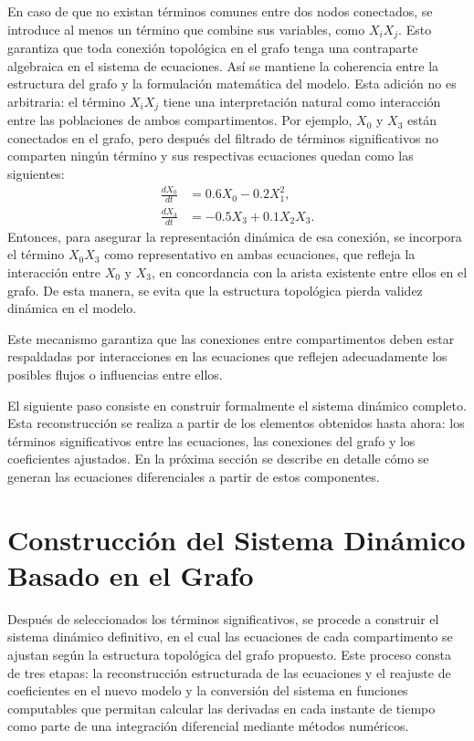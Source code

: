 En caso de que no existan términos comunes entre dos nodos conectados, se introduce al menos un término que combine sus variables, como \(X_i X_j\). Esto garantiza 
que toda conexión topológica en el grafo tenga una contraparte algebraica en el sistema de ecuaciones. Así se mantiene la coherencia entre la estructura del grafo y la 
formulación matemática del modelo. Esta adición no es arbitraria: el término \(X_i X_j\) tiene una interpretación natural como interacción entre las poblaciones de 
ambos compartimentos. Por ejemplo, \(X_0\) y \(X_3\) están conectados en el grafo, pero después del filtrado de términos significativos no comparten ningún término y 
sus respectivas ecuaciones quedan como las siguientes: 
\begin{align*}
\frac{dX_0}{dt} &= 0.6 X_0 - 0.2 X_1^2, \\
\frac{dX_3}{dt} &= -0.5 X_3 + 0.1 X_2 X_3.
\end{align*}
Entonces, para asegurar la representación dinámica de esa conexión, se incorpora el término \(X_0 X_3\) como representativo en ambas ecuaciones, que refleja la 
interacción entre \(X_0\) y \(X_3\), en concordancia con la arista existente entre ellos en el grafo. De esta manera, se evita que la estructura topológica pierda 
validez dinámica en el modelo.

Este mecanismo garantiza que las conexiones entre compartimentos deben estar respaldadas por interacciones en las ecuaciones que reflejen adecuadamente los posibles 
flujos o influencias entre ellos.

El siguiente paso consiste en construir formalmente el sistema dinámico completo. Esta reconstrucción se realiza a partir de los elementos obtenidos hasta ahora: 
los términos significativos entre las ecuaciones, las conexiones del grafo y los coeficientes ajustados. En la próxima sección se describe en detalle cómo se generan 
las ecuaciones diferenciales a partir de estos componentes.

\section{Construcción del Sistema Dinámico Basado en el Grafo}
\label{sec:cons_sis}

Despu\'es de seleccionados los términos significativos, se procede a construir el sistema dinámico definitivo, en el cual las ecuaciones de cada compartimento se ajustan 
según la estructura topológica del grafo propuesto. Este proceso consta de tres etapas: la reconstrucción estructurada de las ecuaciones y el reajuste de coeficientes 
en el nuevo modelo y la conversión del sistema en funciones computables que permitan calcular las derivadas en cada instante de tiempo como parte de una integración 
diferencial mediante métodos numéricos.

